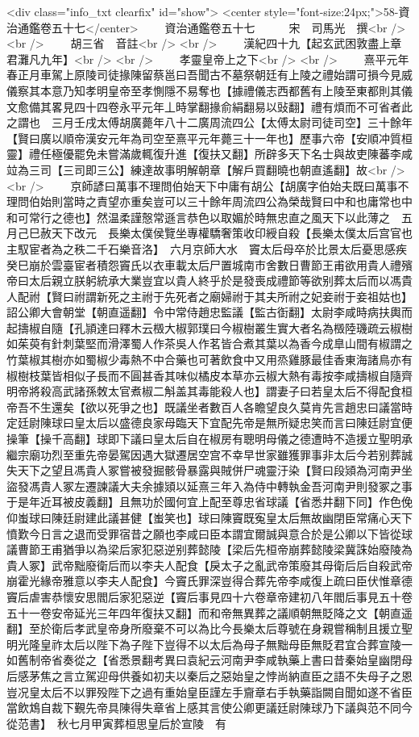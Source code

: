 <div class="info_txt clearfix" id="show">
<center style="font-size:24px;">58-資治通鑑卷五十七</center>
  　　資治通鑑卷五十七　　　宋　司馬光　撰<br />
<br />
　　胡三省　音註<br />
<br />
　　漢紀四十九【起玄武困敦盡上章君灘凡九年】<br />
<br />
　　孝靈皇帝上之下<br />
<br />
　　熹平元年春正月車駕上原陵司徒掾陳留蔡邕曰吾聞古不墓祭朝廷有上陵之禮始謂可損今見威儀察其本意乃知孝明皇帝至孝惻隱不易奪也【據禮儀志西都舊有上陵至東都則其儀文愈備其畧見四十四卷永平元年丄時掌翻掾俞絹翻易以䜴翻】禮有煩而不可省者此之謂也　三月壬戌太傅胡廣薨年八十二廣周流四公【太傅太尉司徒司空】三十餘年【賢曰廣以順帝漢安元年為司空至熹平元年薨三十一年也】歷事六帝【安順冲質桓靈】禮任極優罷免未嘗滿歲輒復升進【復扶又翻】所辟多天下名士與故吏陳蕃李咸竝為三司【三司即三公】練達故事明解朝章【解戶買翻曉也朝直遙翻】故<br />
<br />
　　京師諺曰萬事不理問伯始天下中庸有胡公【胡廣字伯始夫既曰萬事不理問伯始則當時之責望亦重矣豈可以三十餘年周流四公為榮哉賢曰中和也庸常也中和可常行之德也】然温柔謹慤常遜言恭色以取媚於時無忠直之風天下以此薄之　五月己巳赦天下改元　長樂太僕侯覽坐專權驕奢策收印綬自殺【長樂太僕太后宫官也主馭宦者為之秩二千石樂音洛】　六月京師大水　竇太后母卒於比景太后憂思感疾癸巳崩於雲臺宦者積怨竇氏以衣車載太后尸置城南市舍數日曹節王甫欲用貴人禮殯帝曰太后親立朕躬統承大業豈宜以貴人終乎於是發喪成禮節等欲别葬太后而以馮貴人配祔【賢曰祔謂新死之主祔于先死者之廟婦祔于其夫所祔之妃妾祔于妾祖姑也】詔公卿大會朝堂【朝直遥翻】令中常侍趙忠監議【監古衘翻】太尉李咸時病扶輿而起擣椒自隨【孔頴達曰釋木云檓大椒郭璞曰今椒樹叢生實大者名為檓陸璣疏云椒樹如茱萸有針刺葉堅而滑澤蜀人作茶吳人作茗皆合煮其葉以為香今成臯山間有椒謂之竹葉椒其樹亦如蜀椒少毒熱不中合藥也可著飲食中又用烝雞豚最佳香東海諸鳥亦有椒樹枝葉皆相似子長而不圓甚香其味似橘皮本草亦云椒大熱有毒按李咸擣椒自隨齊明帝將殺高武諸孫敇太官煮椒二斛盖其毒能殺人也】謂妻子曰若皇太后不得配食桓帝吾不生還矣【欲以死爭之也】既議坐者數百人各瞻望良久莫肯先言趙忠曰議當時定廷尉陳球曰皇太后以盛德良家母臨天下宜配先帝是無所疑忠笑而言曰陳廷尉宜便操筆【操千高翻】球即下議曰皇太后自在椒房有聰明母儀之德遭時不造援立聖明承繼宗廟功烈至重先帝晏駕因遇大獄遷居空宫不幸早世家雖獲罪事非太后今若别葬誠失天下之望且馮貴人冢嘗被發掘骸骨暴露與賊併尸魂靈汙染【賢曰段熲為河南尹坐盜發馮貴人冢左遷諫議大夫余據熲以延熹三年入為侍中轉執金吾河南尹則發冢之事于是年近耳被皮義翻】且無功於國何宜上配至尊忠省球議【省悉井翻下同】作色俛仰蚩球曰陳廷尉建此議甚健【蚩笑也】球曰陳竇既寃皇太后無故幽閉臣常痛心天下憤歎今日言之退而受罪宿昔之願也李咸曰臣本謂宜爾誠與意合於是公卿以下皆從球議曹節王甫猶爭以為梁后家犯惡逆别葬懿陵【梁后先桓帝崩葬懿陵梁冀誅始廢陵為貴人冢】武帝黜廢衛后而以李夫人配食【戾太子之亂武帝策廢其母衛后后自殺武帝崩霍光緣帝雅意以李夫人配食】今竇氏罪深豈得合葬先帝李咸復上疏曰臣伏惟章德竇后虐害恭懷安思閻后家犯惡逆【竇后事見四十六卷章帝建初八年閻后事見五十卷五十一卷安帝延光三年四年復扶又翻】而和帝無異葬之議順朝無貶降之文【朝直遥翻】至於衛后孝武皇帝身所廢棄不可以為比今長樂太后尊號在身親嘗稱制且援立聖明光隆皇祚太后以陛下為子陛下豈得不以太后為母子無黜母臣無貶君宜合葬宣陵一如舊制帝省奏從之【省悉景翻考異曰袁紀云河南尹李咸執藥上書曰昔秦始皇幽閉母后感茅焦之言立駕迎母供養如初夫以秦后之惡始皇之悖尚納直臣之語不失母子之恩豈况皇太后不以罪殁陛下之過有重始皇臣謹左手齎章右手執藥詣闕自聞如遂不省臣當飲鴆自裁下覲先帝具陳得失章省上感其言使公卿更議廷尉陳球乃下議與范不同今從范書】　秋七月甲寅葬桓思皇后於宣陵　有